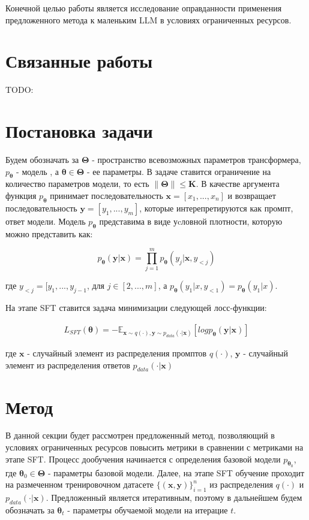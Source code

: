 \documentclass[12pt, twoside]{article}
\newcommand{\bx}{\mathbf{x}}
\newcommand{\by}{\mathbf{y}}
\newcommand{\btheta}{\boldsymbol{\theta}}
\newcommand{\bTheta}{\boldsymbol{\Theta}}
\newcommand{\EE}{\mathbb{E}}
\begin{document}
Конечной целью работы является исследование оправданности применения предложенного метода к маленьким LLM в условиях ограниченных ресурсов.

\vspace{10}

\section{Связанные работы}

TODO:

\vspace{10}

\section{Постановка задачи}

Будем обозначать за $\bTheta$ - пространство всевозможных параметров трансформера, $p_{\btheta}$ - модель , а $\btheta \in \bTheta$ -  ее параметры. В задаче ставится ограничение на количество параметров модели, то есть $\|\bTheta\| \le \mathbf{K}$. В качестве аргумента функция $p_{\btheta}$ принимает последовательность $\bx = [x_1, ..., x_n]$ и возвращает последовательность $\by=[y_1, ..., y_m]$, которые интерепретируются как промпт, ответ модели. Модель $p_{\btheta}$ представима в виде уcловной плотности, которую можно представить как:

$$p_{\btheta}(\by|\bx) = \prod_{j=1}^m p_{\btheta}(y_j|\bx, y_{<j})$$

где $y_{<j} = [y_1, ..., y_{j-1}$, для $j \in [2, ..., m]$, а $p_{\btheta}(y_1|x, y_{<1}) = p_{\btheta}(y_1|x)$.

На этапе SFT ставится задача минимизации следующей лосс-функции:

\begin{align}
    L_{SFT}(\btheta) = -\EE_{\bx \sim q(\cdot), \by \sim p_{data}(\cdot|\bx)}[log p_{\btheta}(\by|\bx)]
\end{align}

где $\bx$ - случайный элемент из распределения промптов $q(\cdot)$, $\by$ - случайный элемент из распределения ответов $p_{data}(\cdot |\bx)$

\vspace{10}

\section{Метод}


В данной секции будет рассмотрен предложенный метод, позволяющий в условиях ограниченных ресурсов повысить метрики в сравнении с метриками на этапе SFT. Процесс дообучения начинается с определения базовой модели $p_{\btheta_0}$, где $\btheta_0 \in \bTheta$ - параметры базовой модели. Далее, на этапе SFT обучение проходит на размеченном тренировочном датасете $\{(\bx, \by)\}_{i=1}^n$ из распределения $q(\cdot)$ и $p_{data}(\cdot | \bx)$. Предложенный является итеративным, поэтому в дальнейшем будем обозначать за $\btheta_t$ - параметры обучаемой модели на итерацие $t$.
\end{document}
